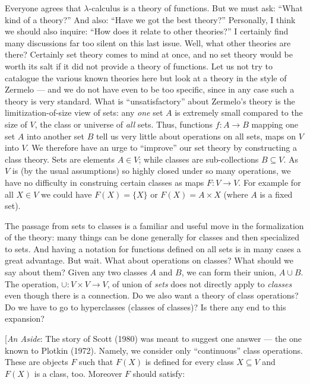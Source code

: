 \documentclass[12pt]{article}
\def\to{\rightarrow}
\def\union{\cup}
\def\l{\lambda}
\def\V{V}
\begin{document}
Everyone agrees that $\l$-calculus is a theory of functions.
But we must ask: ``What kind of a theory?'' And also: ``Have we got the best theory?'' Personally, I think we should also in­quire: ``How does it relate to other theories?'' I certainly find many discussions far too silent on this last issue. Well, what other theories are there? Certainly set theory comes to mind at once, and no set theory would be worth its salt if it did not provide a theory of functions. Let us not try to catalogue the various known theories here but look at a theory in the style of Zermelo --- and we do not have even to be too specific, since in any case such a theory is very standard. What is ``unsatisfactory'' about Zermelo's theory is the limiti­zation-of-size view of sets: any {\it one} set $A$ is extremely small compared to the size of $\V$, the class or universe of {\it all} sets. Thus, functions $f : A \to B$ mapping one set $A$ into another set $B$ tell us very little about operations on all sets, maps on $\V$ into $\V$. We therefore have an urge to ``improve'' our set theory by constructing a class theory. Sets are elements $A \in \V$; while classes are sub-collections $B \subseteq \V$. As $\V$ is (by the usual assump­tions) so highly closed under so many operations, we have no difficulty in construing certain classes as maps $F: \V \to \V$. For example for all $X \in \V$ we could have $F(X) = \{X\}$ or $F(X) = A \times X$ (where $A$ is a fixed set).

The passage from sets to classes is a familiar and useful move in the formalization of the theory: many things can be done generally for classes and then specialized to sets. And having a notation for functions defined on all sets is in many cases a great advantage. But wait. What about operations on classes? What should we say about them? Given any two classes $A$ and $B$, we can form their union, $A \union  B$. The operation, $\union\!: \V \times \V \to \V$, of union of {\it sets} does not directly apply to {\it classes} even though there is a connection. Do we also want a theory of class operations? Do we have to go to hyperclasses (classes of classes)? Is there any end to this expansion?


[{\it An Aside}: The story of Scott (1980) was meant to suggest one answer --- the one known to Plotkin (1972). Namely, we con­sider only ``continuous'' class operations. These are objects $F$ such that $F(X)$ is defined for every class $X \subseteq \V$ and $F(X)$ is a class, too. Moreover $F$ should satisfy:
\end{document}
